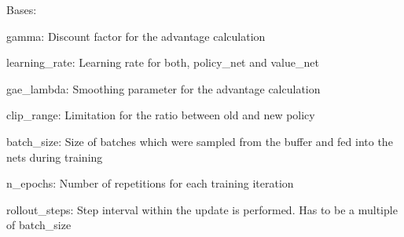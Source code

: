 \documentclass[letterpaper,10pt,english]{sphinxmanual}
\begin{document}
\begin{fulllineitems}
\label{\detokenize{agents.reinforcement_learning:agents.reinforcement_learning.ppo_masked.MaskedPPO}}
\sphinxAtStartPar
Bases: 

\begin{fulllineitems}
\label{\detokenize{agents.reinforcement_learning:agents.reinforcement_learning.ppo_masked.MaskedPPO.__init__}}
\begin{DUlineblock}{0em}
\item[] gamma: Discount factor for the advantage calculation
\item[] learning\_rate: Learning rate for both, policy\_net and value\_net
\item[] gae\_lambda: Smoothing parameter for the advantage calculation
\item[] clip\_range: Limitation for the ratio between old and new policy
\item[] batch\_size: Size of batches which were sampled from the buffer and fed into the nets during training
\item[] n\_epochs: Number of repetitions for each training iteration
\item[] rollout\_steps: Step interval within the update is performed. Has to be a multiple of batch\_size
\end{DUlineblock}

\end{fulllineitems}



\end{fulllineitems}
\end{document}
